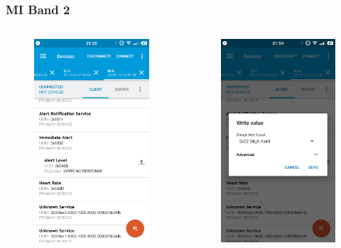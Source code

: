 \documentclass[UTF8]{ctexbeamer}
\begin{document}
\begin{frame}
  \frametitle{MI Band 2}
   \begin{columns}
  \begin{figure}
    \includegraphics[width=0.6\linewidth]{alert.png}
  \end{figure}
  \begin{figure}
    \includegraphics[width=0.6\linewidth]{alert2.png}
  \end{figure}
  \end{columns}
\end{frame}
 
\end{document}
